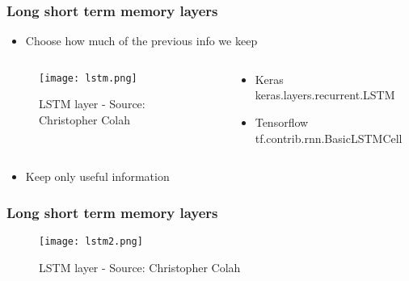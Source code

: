 \documentclass{beamer}
\begin{document}
\begin{frame}
	\frametitle{Long short term memory layers}
    \begin{itemize}
    \item Choose how much of the previous info we keep
    \end{itemize}
    \begin{columns}[T]
    \begin{column}{.5\textwidth}
    \begin{block}{}
    \begin{figure}
		\texttt{[image: lstm.png]}
		\caption{LSTM layer - Source: Christopher Colah}
	\end{figure}
    \end{block}
    \end{column}
    \begin{column}{.5\textwidth}
    \begin{block}{}
    \begin{itemize}
    	\item Keras
        keras.layers.recurrent.LSTM
        \item Tensorflow
       tf.contrib.rnn.BasicLSTMCell
    \end{itemize}
    \end{block}
    \end{column}
    \end{columns}
    \begin{itemize}
    \item Keep only useful information
    \end{itemize}
\end{frame}

\begin{frame}
	\frametitle{Long short term memory layers}
    \begin{figure}
		\texttt{[image: lstm2.png]}
		\caption{LSTM layer - Source: Christopher Colah}
	\end{figure}
\end{frame}
\end{document}
